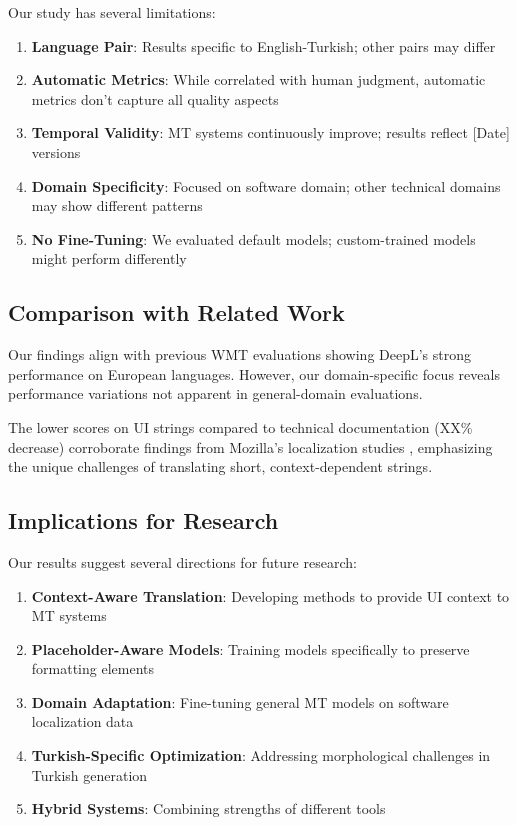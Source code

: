 Our study has several limitations:

\begin{enumerate}
    \item \textbf{Language Pair}: Results specific to English-Turkish; other pairs may differ
    \item \textbf{Automatic Metrics}: While correlated with human judgment, automatic metrics don't capture all quality aspects
    \item \textbf{Temporal Validity}: MT systems continuously improve; results reflect [Date] versions
    \item \textbf{Domain Specificity}: Focused on software domain; other technical domains may show different patterns
    \item \textbf{No Fine-Tuning}: We evaluated default models; custom-trained models might perform differently
\end{enumerate}

\subsection{Comparison with Related Work}

Our findings align with previous WMT evaluations \cite{wmt2020findings} showing DeepL's strong performance on European languages. However, our domain-specific focus reveals performance variations not apparent in general-domain evaluations.

The lower scores on UI strings compared to technical documentation (XX\% decrease) corroborate findings from Mozilla's localization studies \cite{mozilla2018localization}, emphasizing the unique challenges of translating short, context-dependent strings.

\subsection{Implications for Research}

Our results suggest several directions for future research:

\begin{enumerate}
    \item \textbf{Context-Aware Translation}: Developing methods to provide UI context to MT systems
    \item \textbf{Placeholder-Aware Models}: Training models specifically to preserve formatting elements
    \item \textbf{Domain Adaptation}: Fine-tuning general MT models on software localization data
    \item \textbf{Turkish-Specific Optimization}: Addressing morphological challenges in Turkish generation
    \item \textbf{Hybrid Systems}: Combining strengths of different tools
\end{enumerate}

